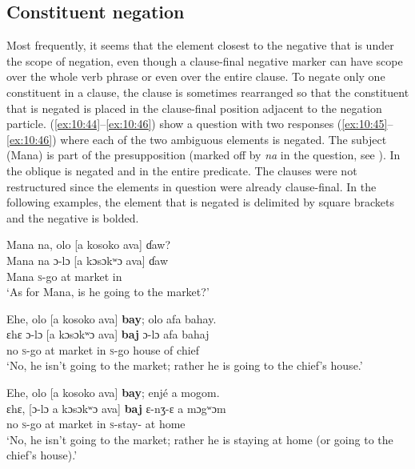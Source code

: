 \subsection{Constituent negation}\label{sec:10.2.3}
\hypertarget{RefHeading1212961525720847}{}
Most frequently, it seems that the element closest to the negative that is under the scope of negation, even though a clause-final negative marker can have scope over the whole verb phrase or even over the entire clause. To negate only one constituent in a clause, the clause is sometimes rearranged so that the constituent that is negated is placed in the clause-final position adjacent to the negation particle. (\ref{ex:10:44}--\ref{ex:10:46}) show a question  with two responses (\ref{ex:10:45}--\ref{ex:10:46}) where each of the two ambiguous elements is negated. The subject (Mana) is part of the presupposition (marked off by \textit{na} in the question, see ). In  the oblique is negated and in  the entire predicate. The clauses were not restructured since the elements in question were already clause-final. In the following examples, the element that is negated is delimited by square brackets and the negative is bolded.

\ea \label{ex:10:44}
Mana  na,  olo  [a  kosoko  ava]  ɗaw?\\
\gll  Mana   na   ɔ{}-lɔ   [a   kɔsɔkʷɔ   ava]  ɗaw\\
      Mana  {\PSP}  \textsc{s}-go  at  market  in  {\QUEST}\\
\glt  ‘As for Mana, is he going to the market?’
\z

\ea \label{ex:10:45}
Ehe,  olo  [a  kosoko  ava]  \textbf{bay};  olo  afa  bahay.\\
\gll  ɛhɛ     ɔ-lɔ   [a   kɔsɔkʷɔ   ava]  \textbf{baj}    ɔ-lɔ   afa     bahaj\\
      no    \textsc{s}-go  at  market  in  {\NEG}  \textsc{s}-go  {house of}    chief\\
\glt  ‘No, he isn’t going to the market; rather he is going to the chief’s house.’
\z

\ea \label{ex:10:46}
Ehe,  olo  [a  kosoko  ava]  \textbf{bay};  enjé  a  mogom.\\
\gll  ɛhɛ,   [ɔ-lɔ   a   kɔsɔkʷɔ   ava]  \textbf{baj}   ɛ-nʒ-ɛ     a   mɔgʷɔm\\
      no    \textsc{s}-go  at  market  in  {\NEG}  \textsc{s}-stay-{\CL}  at  home\\
\glt  ‘No, he isn’t going to the market; rather he is staying at home (or going to the chief’s house).’
\z

